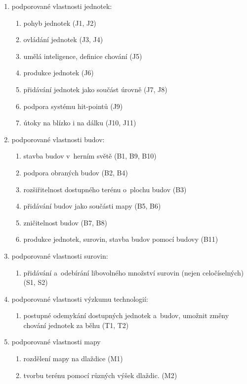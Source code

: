 \begin{enumerate}
	\item podporované vlastnosti jednotek:
		\begin{enumerate}
			\item pohyb jednotek (J1, J2)
			\item ovládání jednotek (J3, J4)
			\item umělá inteligence, definice chování (J5)
			\item produkce jednotek (J6)
			\item přidávání jednotek jako součást úrovně (J7, J8)
			\item podpora systému hit-pointů (J9)
			\item útoky na blízko i na dálku (J10, J11)
		\end{enumerate}
	\item podporované vlastnosti budov:
		\begin{enumerate}
			\item stavba budov v~herním světě (B1, B9, B10)
			\item podpora obraných budov (B2, B4)
			\item rozšiřitelnost dostupného terénu o~plochu budov (B3)
			\item přidávání budov jako součásti mapy (B5, B6)
			\item zničitelnost budov (B7, B8)
			\item produkce jednotek, surovin, stavba budov pomocí budovy (B11)
		\end{enumerate}
	\item podporované vlastnosti surovin:
		\begin{enumerate}
			\item přidávání a~odebírání libovolného množství surovin (nejen celočíselných) (S1, S2)
		\end{enumerate}
	\item podporované vlastnosti výzkumu technologií:
		\begin{enumerate}
			\item postupné odemykání dostupných jednotek a~budov, umožnit změny chování jednotek za běhu (T1, T2)
		\end{enumerate}
	\item podporované vlastnosti mapy
		\begin{enumerate}
			\item rozdělení mapy na dlaždice (M1)
			\item tvorbu terénu pomocí různých výšek dlaždic. (M2)

\end{enumerate}
\end{enumerate}
